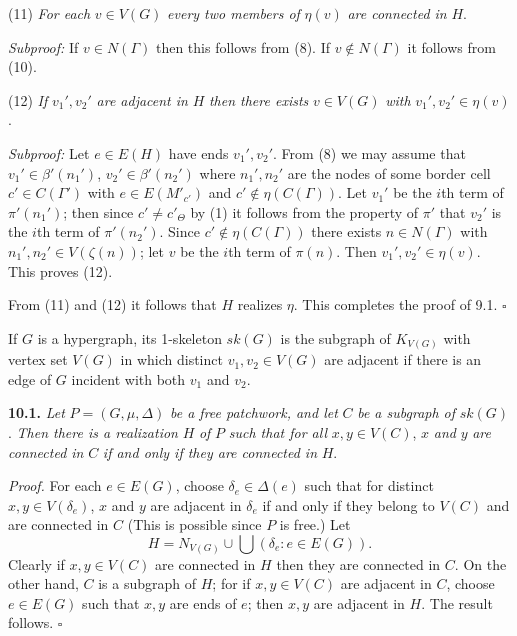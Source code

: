 \hspace*{12pt}(11) \textit{For each} $v \in V(G)$ \textit{every two members of} $\eta(v)$ \textit{are connected in} $H$.

\textit{Subproof:} If $v \in N(\Gamma)$ then this follows from (8). If $v \notin N(\Gamma)$ it follows from (10).

\hspace*{12pt}(12) \textit{If} $v_1', v_2'$ \textit{are adjacent in} $H$ \textit{then there exists} $v \in V(G)$ \textit{with} $v_1', v_2' \in \eta(v)$.

\textit{Subproof:} Let $e \in E(H)$ have ends $v_1', v_2'$. From (8) we may assume that $v_1' \in \beta'(n_1')$, $v_2' \in \beta'(n_2')$ where $n_1', n_2'$ are the nodes of some border cell $c' \in C(\Gamma')$ with $e \in E(M'_{c'})$ and $c' \notin \eta(C(\Gamma))$. Let $v_1'$ be the $i$th term of $\pi'(n_1')$; then since $c' \ne c'_\Theta$ by (1) it follows from the property of $\pi'$ that $v_2'$ is the $i$th term of $\pi'(n_2')$. Since $c' \notin \eta(C(\Gamma))$ there exists $n \in N(\Gamma)$ with $n_1', n_2' \in V(\zeta(n))$; let $v$ be the $i$th term of $\pi(n)$. Then $v_1', v_2' \in \eta(v)$. This proves (12).

From (11) and (12) it follows that $H$ realizes $\eta$. This completes the proof of 9.1. $\square$


If $G$ is a hypergraph, its 1-skeleton $sk(G)$ is the subgraph of $K_{V(G)}$ with vertex set $V(G)$ in which distinct $v_1, v_2 \in V(G)$ are adjacent if there is an edge of $G$ incident with both $v_1$ and $v_2$.

\textbf{10.1.} \textit{Let} $P = (G, \mu, \Delta)$ \textit{be a free patchwork, and let} $C$ \textit{be a subgraph of} $sk(G)$. \textit{Then there is a realization} $H$ \textit{of} $P$ \textit{such that for all} $x, y \in V(C)$, $x$ \textit{and} $y$ \textit{are connected in} $C$ \textit{if and only if they are connected in} $H$.

\textit{Proof.} For each $e \in E(G)$, choose $\delta_e \in \Delta(e)$ such that for distinct $x, y \in V(\delta_e)$, $x$ and $y$ are adjacent in $\delta_e$ if and only if they belong to $V(C)$ and are connected in $C$ (This is possible since $P$ is free.) Let
\begin{equation*}
H = N_{V(G)} \cup \bigcup(\delta_e : e \in E(G)).
\end{equation*}
Clearly if $x, y \in V(C)$ are connected in $H$ then they are connected in $C$. On the other hand, $C$ is a subgraph of $H$; for if $x, y \in V(C)$ are adjacent in $C$, choose $e \in E(G)$ such that $x, y$ are ends of $e$; then $x, y$ are adjacent in $H$. The result follows. $\square$

